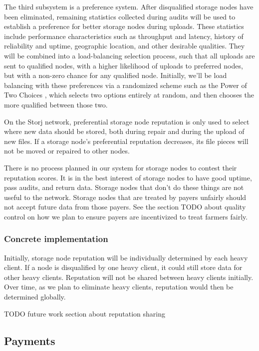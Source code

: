 \documentclass[a4paper,10pt]{article} \usepackage[utf8]{inputenc}
\newcommand{\todo}[1]{{\color{red} TODO #1 }}
\begin{document}
The third subsystem is a preference system. After disqualified storage nodes
have been eliminated, remaining statistics collected during audits
will be used to establish a preference for better storage nodes during uploads.
These statistics include performance characteristics such as throughput and
latency, history of reliability and uptime, geographic location, and other
desirable qualities.
They will be combined into a load-balancing selection process, such
that all uploads are sent to qualified nodes, with a higher likelihood of
uploads to preferred nodes, but with a non-zero chance for any qualified node.
Initially, we'll be load balancing with these preferences via a randomized
scheme such as the Power of Two Choices \cite{power-of-two-choices}, which
selects two options entirely at random, and then chooses the more qualified
between those two.

On the Storj network, preferential storage node reputation is only used to
select where new data should be stored, both during repair and during the
upload of new files.
If a storage node's preferential reputation decreases, its file pieces will not
be moved or repaired to other nodes.

There is no process planned in our system for storage nodes to contest their
reputation scores. It is in the best interest of storage nodes to have good
uptime, pass audits, and return data. Storage nodes that don't do these things
are not useful to the network. Storage nodes that are treated by payers unfairly
should not accept future data from those payers. See the section \todo{} about
quality control on how we plan to ensure payers are incentivized to treat
farmers fairly.

\subsubsection{Concrete implementation}

Initially, storage node reputation will be individually determined by each
heavy client. If a node is disqualified by one heavy client, it could still
store data for other heavy clients. Reputation will not be shared between
heavy clients initially. Over time, as we plan to eliminate heavy clients,
reputation would then be determined globally.

\todo{future work section about reputation sharing}

\subsection{Payments}
\end{document}
